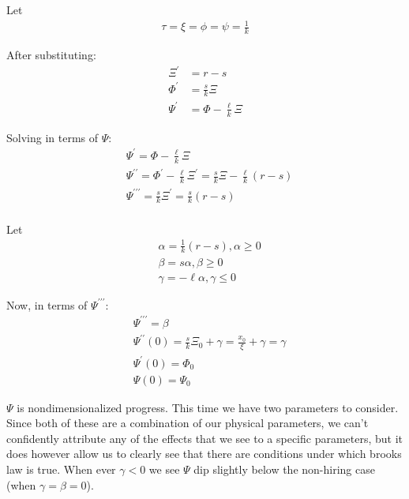 \documentclass{article}
\newenvironment{atomize}
    {\begin{list} {} {
            \setlength\itemindent{0pt}
            \setlength\leftmargin{10pt}
            \setlength\labelwidth{0pt}
    }}
    {\end{list}}
\begin{document}
\begin{atomize}
\begin{atomize}
        \item Let
          \begin{align*}
            \tau = \xi = \phi = \psi = \frac{1}{k}
          \end{align*}
          
        \item After substituting:
          \begin{align*}
            \Xi^{\prime} &= r - s \\[6pt]
            \Phi^{\prime} &= \frac{s}{k}\Xi \\[6pt]
            \Psi^{\prime} &= \Phi - \frac{\ell}{k}\Xi
          \end{align*}

        \item Solving in terms of $\Psi$:
          \begin{align*}
            &\Psi^{\prime} = \Phi - \frac{\ell}{k}\Xi \\[6pt]
            &\Psi^{\prime\prime} = \Phi^{\prime} - \frac{\ell}{k}\Xi^{\prime} 
            = \frac{s}{k}\Xi - \frac{\ell}{k}(r - s) \\[6pt]
            &\Psi^{\prime\prime\prime} = \frac{s}{k}\Xi^{\prime} = 
            \frac{s}{k}(r - s) \\[6pt]
          \end{align*}

        \item Let
          \begin{align*}
            &\alpha = \frac{1}{k}(r-s), \alpha \geq 0 \\[6pt]
            &\beta = s\alpha, \beta \geq 0 \\[6pt]
            &\gamma = -\ell\alpha, \gamma \leq 0
          \end{align*}

        \item Now, in terms of $\Psi^{\prime\prime\prime}$:
          \begin{align*}
            &\Psi^{\prime\prime\prime} = \beta \\[6pt]
            &\Psi^{\prime\prime}(0) = \frac{s}{k}\Xi_{0} + \gamma = 
              \frac{x_{0}}{\xi} + \gamma = \gamma \\[6pt]
            &\Psi^{\prime}(0) = \Phi_{0} \\[6pt]
            &\Psi(0) = \Psi_{0}
          \end{align*}

        \item $\Psi$ is nondimensionalized progress. This time we have two
        parameters to consider. Since both of these are a combination of our
        physical parameters, we can't confidently attribute any of the effects
        that we see to a specific parameters, but it does however allow us to
        clearly see that there are conditions under which brooks law is true.
        When ever $\gamma < 0$ we see $\Psi$ dip slightly below the non-hiring
        case (when $\gamma = \beta = 0$).


\end{atomize}
\end{atomize}
\end{document}
